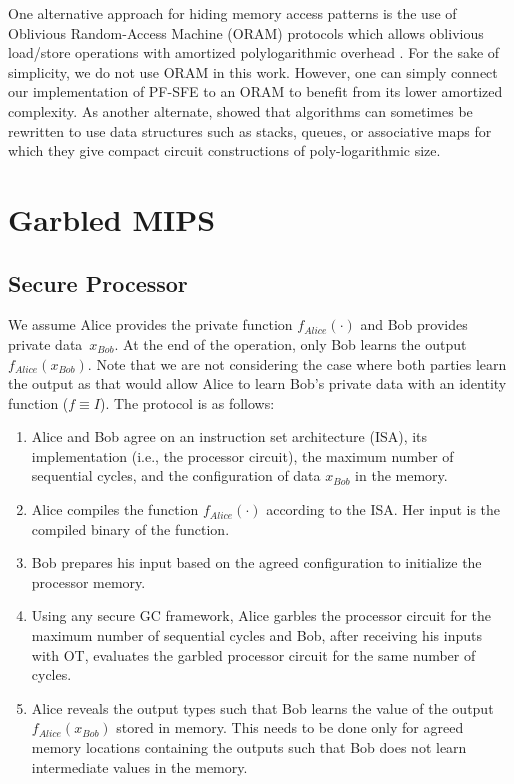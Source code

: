 One alternative approach for hiding memory access patterns is the use of Oblivious Random-Access Machine (ORAM) protocols \cite{goldreich1996software} which allows oblivious load/store operations with amortized polylogarithmic overhead \cite{gordon2012secure,liu2014automating,lu2013garble,gentry2014garbled}.
For the sake of simplicity, we do not use ORAM in this work.
However, one can simply connect our implementation of PF-SFE to an ORAM to benefit from its lower amortized complexity.
As another alternate, \cite{zahur2013circuit} showed that algorithms can sometimes be rewritten to use data structures such as stacks, queues, or associative maps for which they give compact circuit constructions of poly-logarithmic size.

\section{Garbled MIPS}
\subsection{Secure Processor}
We assume Alice provides the private function $f_{Alice}(\cdot)$ and Bob provides private data~$x_{Bob}$.
At the end of the operation, only Bob learns the output $f_{Alice}(x_{Bob})$.
Note that we are not considering the case where both parties learn the output as that would allow Alice to learn Bob's private data with an identity function ($f\equiv I$).
The protocol is as follows:

\begin{enumerate}
\item
  Alice and Bob agree on an instruction set architecture (ISA), its implementation (i.e., the processor circuit), the maximum number of sequential cycles, and the configuration of data $x_{Bob}$ in the memory.
\item
  Alice compiles the function $f_{Alice}(\cdot)$ according to the ISA.
  Her input is the compiled binary of the function.
\item
  Bob prepares his input based on the agreed configuration to initialize the processor memory.
\item
  Using any secure GC framework, Alice garbles the processor circuit for the maximum number of sequential cycles and Bob, after receiving his inputs with OT, evaluates the garbled processor circuit for the same number of cycles.

\item
  Alice reveals the output types such that Bob learns the value of the output $f_{Alice}(x_{Bob})$ stored in memory.
  This needs to be done only for agreed memory locations containing the outputs such that Bob does not learn intermediate values in the memory.
\end{enumerate}

